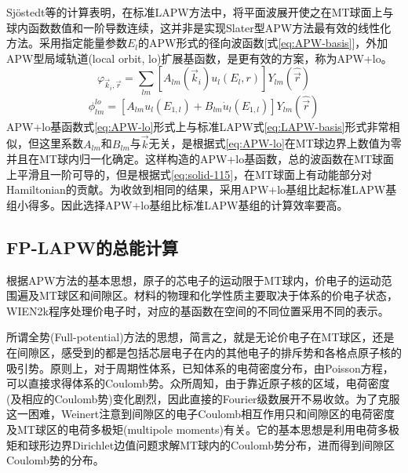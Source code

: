 Sj\"ostedt等\cite{SSC114-15_2000}的计算表明，在标准LAPW方法中，将平面波展开使之在MT球面上与球内函数数值和一阶导数连续，这并非是实现Slater型APW方法最有效的线性化方法。采用指定能量参数$E_l$的APW形式的径向波函数[式\eqref{eq:APW-basis}]，外加APW型局域轨道(local orbit, lo)扩展基函数，是更有效的方案，称为APW+lo。
\begin{equation}
  \varphi_{\vec k_i,\vec r}=\sum_{lm}[A_{lm}(\vec k_i)u_l(E_l,r)]Y_{lm}(\hat{\vec r})
  \label{eq:APW-basis}
\end{equation}
\begin{equation}
  \phi_{lm}^{lo}=[A_{lm}u_l(E_{1,l})+B_{lm}\dot u_l(E_{1,l})]Y_{lm}(\hat{\vec r})
  \label{eq:APW-lo}
\end{equation}
APW+lo基函数式\eqref{eq:APW-lo}形式上与标准LAPW式\eqref{eq:LAPW-basis}形式非常相似，但这里系数$A_{lm}$和$B_{lm}$与$\vec k$无关，是根据式\eqref{eq:APW-lo}在MT球边界上数值为零并且在MT球内归一化确定。这样构造的APW+lo基函数，总的波函数在MT球面上平滑且一阶可导的，但是根据式\eqref{eq:solid-115}，在MT球面上有动能部分对Hamiltonian的贡献。为收敛到相同的结果，采用APW+lo基组比起标准LAPW基组小得多\cite{PRB64-195134_2001}。因此选择APW+lo基组比标准LAPW基组的计算效率要高。


\subsection{FP-LAPW的总能计算}
根据\textrm{APW}方法的基本思想，原子的芯电子的运动限于\textrm{MT}球内，价电子的运动范围遍及\textrm{MT}球区和间隙区。材料的物理和化学性质主要取决于体系的价电子状态，\textrm{WIEN2k}程序处理价电子时，对应的基函数在空间的不同位置采用不同的表示。

所谓全势(\textrm{Full-potential})方法的思想，简言之，就是无论价电子在\textrm{MT}球区，还是在间隙区，感受到的都是包括芯层电子在内的其他电子的排斥势和各格点原子核的吸引势。原则上，对于周期性体系，已知体系的电荷密度分布，由\textrm{Poisson}方程，可以直接求得体系的\textrm{Coulomb}势。众所周知，由于靠近原子核的区域，电荷密度(及相应的\textrm{Coulomb}势)变化剧烈，因此直接的\textrm{Fourier}级数展开不易收敛。为了克服这一困难，\textrm{Weinert}\cite{JMP22-2433_1981}注意到间隙区的电子\textrm{Coulomb}相互作用只和间隙区的电荷密度及\textrm{MT}球区的电荷多极矩(\textrm{multipole moments})有关。它的基本思想是利用电荷多极矩和球形边界\textrm{Dirichlet}边值问题求解\textrm{MT}球内的\textrm{Coulomb}势分布，进而得到间隙区\textrm{Coulomb}势的分布。

